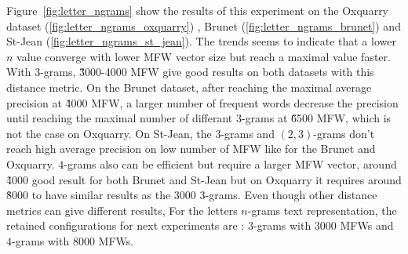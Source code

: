 Figure~\ref{fig:letter_ngrams} show the results of this experiment on the Oxquarry dataset (\ref{fig:letter_ngrams_oxquarry}) , Brunet (\ref{fig:letter_ngrams_brunet}) and St-Jean (\ref{fig:letter_ngrams_st_jean}).
The trends seems to indicate that a lower $n$ value converge with lower MFW vector size but reach a maximal value faster.
With $3$-grams, \~3000-4000 MFW give good results on both datasets with this distance metric.
On the Brunet dataset, after reaching the maximal average precision at \~4000 MFW, a larger number of frequent words decrease the precision until reaching the maximal number of differant $3$-grams at \~6500 MFW, which is not the case on Oxquarry.
On St-Jean, the $3$-grams and $(2,3)$-grams don't reach high average precision on low number of MFW like for the Brunet and Oxquarry.
$4$-grams also can be efficient but require a larger MFW vector, around \~4000 good result for both Brunet and St-Jean but on Oxquarry it requires around \~8000 to have similar results as the 3000 $3$-grams.
Even though other distance metrics can give different results,
For the letters $n$-grams text representation, the retained configurations for next experiments are : $3$-grams with 3000 MFWs and $4$-grams with 8000 MFWs.

